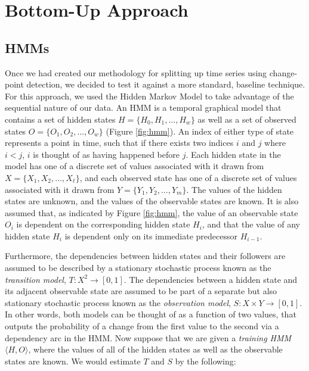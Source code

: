 \section{Bottom-Up Approach}
\label{sec:bottomup}

\subsection{HMMs}

Once we had created our methodology for splitting up time series using change-
point detection, we decided to test it against a more standard,
baseline technique. For this approach, we used the Hidden Markov Model to take
advantage of the sequential nature of our data. An HMM is a temporal graphical model
that contains a set of hidden states $H = \{H_0,H_1, \ldots, H_w\}$ as well as a set of
observed states $O = \{O_1,O_2, \ldots, O_w\}$ (Figure \ref{fig:hmm}). An index
of either type of state represents a point in time, such that if there exists
two indices $i$ and $j$ where $i < j$, $i$ is thought of as having happened
before $j$. Each hidden state in the model has one of a discrete set of values associated
with it drawn from $X=\{X_1,X_2, \ldots, X_{\ell}\}$, and each observed state has one
of a discrete set of values associated with it drawn from $Y=\{Y_1,Y_2, \ldots, Y_m\}$.
The values of the hidden states are unknown, and the values of the observable
states are known.
It is also assumed that, as indicated by Figure \ref{fig:hmm}, the
value of an observable state $O_i$ is dependent on the corresponding
hidden state $H_i$, and that the value of any hidden state $H_i$ is dependent only on
its immediate predecessor $H_{i-1}$.

Furthermore, the dependencies between hidden states and their followers
are assumed to be described by a stationary stochastic process
known as the \emph{transition model}, \mbox{$T: X^2 \rightarrow [0,1]$}.
The dependencies between a hidden state and its adjacent
observable state are assumed to be part of a separate but also
stationary stochastic process known as the \emph{observation model},
$S: X \times Y \rightarrow [0,1]$. In other words, both models can be thought
of as a function of two values, that outputs the probability of a
change from the first value to the second via a dependency arc in the HMM.
Now suppose that we are given a \emph{training HMM} $\langle H,O \rangle$,
where the values of all of the hidden states as well as the
observable states are known. We would estimate $T$ and $S$ by the following:

